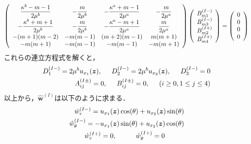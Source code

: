 \begin{align}
	\left(
	\begin{array}{cccc}
		{\displaystyle\frac{ \kappa^b-m-1}{2\mu^{b}}}& {\displaystyle-\frac{m}{2\mu^{b}}} &
		{\displaystyle-\frac{\kappa^a+m-1}{2\mu^{a}}} & {\displaystyle-\frac{m}{2\mu^{a}}} \\
		{\displaystyle-\frac{\kappa^b+m+1}{2\mu^{b}}} & {\displaystyle-\frac{m}{2\mu^{b}}} &
		{\displaystyle-\frac{\kappa^a-m+1}{2\mu^{a}}} & {\displaystyle \frac{m}{2\mu^{a}}} \\
		-(m+1)(m-2) & -m(m-1) & (m+2)(m-1) & m(m+1) \\
		-m(m+1) & -m(m-1) & -m(m-1) & -m(m+1)\\
	\end{array}
	\right)
	\left(
	\begin{array}{c}
		B_{m1}^{(I-)} \\
	 	B_{m3}^{(I-)} \\
		B_{m2}^{(I+)}\\
	 	B_{m4}^{(I+)} \\
	\end{array}
	\right)
	=
	\left(
	\begin{array}{c}
		0 \\
	 	0 \\
		0 \\
	 	0 \\
	\end{array}
	\right)
\end{align}
これらの連立方程式を解くと，
\begin{align}
	D_{1}^{(I-)}=2\mu^{b}u_{x_{1}}(\bm{z}),\hspace{0.5cm}
	D_{2}^{(I-)}=2\mu^{b}u_{x_{2}}(\bm{z}),\hspace{0.5cm}D_{3}^{(I-)}=0
	\nonumber
	\\
	A_{ij}^{(I\pm)}=0,\hspace{0.5cm}
	B_{ij}^{(I\pm)}=0,\hspace{0.5cm}(i\geq0,1\leq j\leq4)
\end{align}
以上から，$\hat{\bm{w}}^{(I)}$は以下のように求まる．
\begin{align}
	\hat{w}_{r}^{(I-)}=u_{x_{1}}(\bm{z})\cos(\theta)+u_{x_{2}}(\bm{z})\sin(\theta)
	\nonumber
	\\
	\hat{w}_{\theta}^{(I-)}=-u_{x_{1}}(\bm{z})\sin(\theta)+u_{x_{2}}(\bm{z})\cos(\theta)
	\label{eq:w1InSol}
	\\
	\hat{w}_{r}^{(I+)}=0,\hspace{1.0cm}\hat{w}_{\theta}^{(I+)}=0\hspace{1.0cm}
	\label{eq:w1OutSol}
\end{align}

